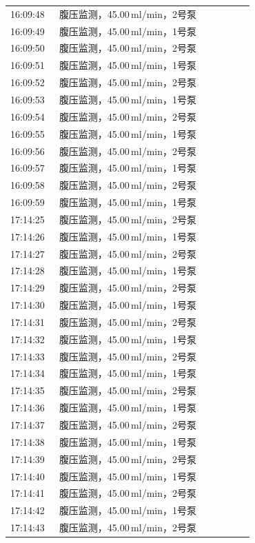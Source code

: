 \documentclass[UTF8,10pt,a4paper,fontset=fandol]{ctexart}
\begin{document}
\begin{center}
\begin{tabular}{p{0.18\linewidth}p{0.72\linewidth}}
16:09:48 & 腹压监测，45.00\,ml/min，2号泵\\
16:09:49 & 腹压监测，45.00\,ml/min，1号泵\\
16:09:50 & 腹压监测，45.00\,ml/min，2号泵\\
16:09:51 & 腹压监测，45.00\,ml/min，1号泵\\
16:09:52 & 腹压监测，45.00\,ml/min，2号泵\\
16:09:53 & 腹压监测，45.00\,ml/min，1号泵\\
16:09:54 & 腹压监测，45.00\,ml/min，2号泵\\
16:09:55 & 腹压监测，45.00\,ml/min，1号泵\\
16:09:56 & 腹压监测，45.00\,ml/min，2号泵\\
16:09:57 & 腹压监测，45.00\,ml/min，1号泵\\
16:09:58 & 腹压监测，45.00\,ml/min，2号泵\\
16:09:59 & 腹压监测，45.00\,ml/min，1号泵\\
17:14:25 & 腹压监测，45.00\,ml/min，2号泵\\
17:14:26 & 腹压监测，45.00\,ml/min，1号泵\\
17:14:27 & 腹压监测，45.00\,ml/min，2号泵\\
17:14:28 & 腹压监测，45.00\,ml/min，1号泵\\
17:14:29 & 腹压监测，45.00\,ml/min，2号泵\\
17:14:30 & 腹压监测，45.00\,ml/min，1号泵\\
17:14:31 & 腹压监测，45.00\,ml/min，2号泵\\
17:14:32 & 腹压监测，45.00\,ml/min，1号泵\\
17:14:33 & 腹压监测，45.00\,ml/min，2号泵\\
17:14:34 & 腹压监测，45.00\,ml/min，1号泵\\
17:14:35 & 腹压监测，45.00\,ml/min，2号泵\\
17:14:36 & 腹压监测，45.00\,ml/min，1号泵\\
17:14:37 & 腹压监测，45.00\,ml/min，2号泵\\
17:14:38 & 腹压监测，45.00\,ml/min，1号泵\\
17:14:39 & 腹压监测，45.00\,ml/min，2号泵\\
17:14:40 & 腹压监测，45.00\,ml/min，1号泵\\
17:14:41 & 腹压监测，45.00\,ml/min，2号泵\\
17:14:42 & 腹压监测，45.00\,ml/min，1号泵\\
17:14:43 & 腹压监测，45.00\,ml/min，2号泵\\

\end{tabular}
\end{center}
\end{document}
